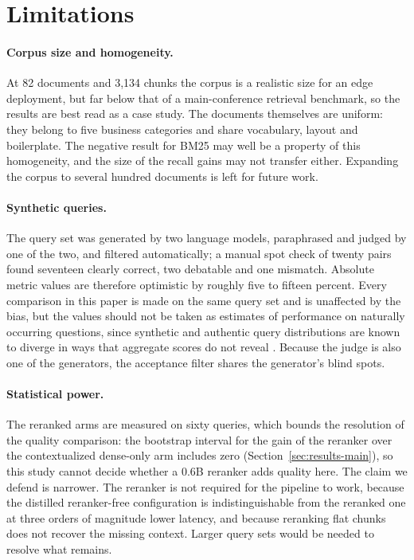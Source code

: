 \section{Limitations}
\label{sec:limitations}

\paragraph{Corpus size and homogeneity.}
At 82 documents and 3{,}134 chunks the corpus is a realistic size for an edge
deployment, but far below that of a main-conference retrieval benchmark, so the
results are best read as a case study. The documents themselves are uniform:
they belong to five business categories and share vocabulary, layout and
boilerplate. The negative result for BM25 may well be a property of this
homogeneity, and the size of the recall gains may not transfer either.
Expanding the corpus to several hundred documents is left for future work.

\paragraph{Synthetic queries.}
The query set was generated by two language models, paraphrased and judged by
one of the two, and filtered automatically; a manual spot check of twenty pairs
found seventeen clearly correct, two debatable and one mismatch. Absolute metric
values are therefore optimistic by roughly five to fifteen percent. Every
comparison in this paper is made on the same query set and is unaffected by the
bias, but the values should not be taken as estimates of performance on
naturally occurring questions, since synthetic and authentic query distributions
are known to diverge in ways that aggregate scores do not reveal
\citep{kucia2026synthetic}. Because the judge is also one of the generators, the
acceptance filter shares the generator's blind spots.

\paragraph{Statistical power.}
The reranked arms are measured on sixty queries, which bounds the resolution of
the quality comparison: the bootstrap interval for the gain of the reranker
over the contextualized dense-only arm includes zero
(Section~\ref{sec:results-main}), so this study cannot decide whether a 0.6B
reranker adds quality here. The claim we defend is narrower. The reranker is not
required for the pipeline to work, because the distilled reranker-free
configuration is indistinguishable from the reranked one at three orders of
magnitude lower latency, and because reranking flat chunks does not recover the
missing context. Larger query sets would be needed to resolve what remains.

